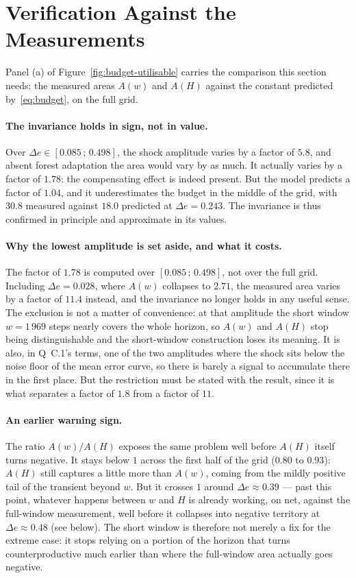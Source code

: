 \documentclass[11pt,a4paper]{article}
\begin{document}
\section{Verification Against the Measurements}
\label{sec:verif}

Panel (a) of Figure~\ref{fig:budget-utilisable} carries the comparison this section
needs: the measured areas $A(w)$ and $A(H)$ against the constant
predicted by~\eqref{eq:budget}, on the full grid.

\paragraph{The invariance holds in sign, not in value.} Over
$\Delta e \in [0.085\,;\,0.498]$, the shock amplitude varies by a factor of $5.8$, and
absent forest adaptation the area would vary by as much. It actually varies by a
factor of $\mathbf{1.78}$: the compensating effect is indeed present. But the model
predicts a factor of $1.04$, and it underestimates the budget in the middle of the
grid, with $30.8$ measured against $18.0$ predicted at $\Delta e = 0.243$. The
invariance is thus confirmed in principle and approximate in its values.

\paragraph{Why the lowest amplitude is set aside, and what it costs.} The factor of
$1.78$ is computed over $[0.085\,;\,0.498]$, not over the full grid. Including
$\Delta e = 0.028$, where $A(w)$ collapses to $2.71$, the measured area varies by a factor
of $\mathbf{11.4}$ instead, and the invariance no longer holds in any useful sense.
The exclusion is not a matter of convenience: at that amplitude the short window
$w = 1\,969$ steps nearly covers the whole horizon, so $A(w)$ and $A(H)$ stop being
distinguishable and the short-window construction loses its meaning. It is also, in
Q~C.1's terms, one of the two amplitudes where the shock sits below the noise floor of
the mean error curve, so there is barely a signal to accumulate there in the first
place. But the restriction must be stated with the result, since it is what separates a
factor of $1.8$ from a factor of $11$.

\paragraph{An earlier warning sign.} The ratio $A(w)/A(H)$ exposes the same problem
well before $A(H)$ itself turns negative. It stays below $1$ across the first half of
the grid ($0.80$ to $0.93$): $A(H)$ still captures a little more than $A(w)$, coming
from the mildly positive tail of the transient beyond $w$. But it crosses $1$ around
$\Delta e \approx 0.39$ --- past this point, whatever happens between $w$ and $H$ is
already working, on net, against the full-window measurement, well before it collapses
into negative territory at $\Delta e \approx 0.48$ (see below). The short window is
therefore not merely a fix for the extreme case: it stops relying on a portion of the
horizon that turns counterproductive much earlier than where the full-window area
actually goes negative.
\end{document}
